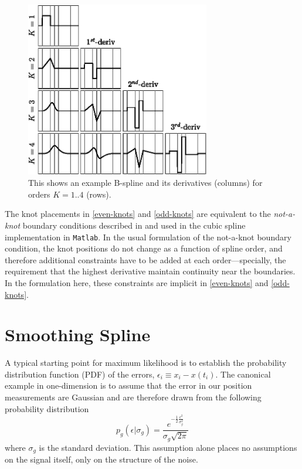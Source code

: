 \documentclass[10pt,journal]{IEEEtran}
\begin{document}
\begin{figure}
  \centerline{\includegraphics[width=19pc,angle=0]{figures/bsplines}}
  \caption{This shows an example B-spline and its derivatives (columns) for orders $K=1..4$ (rows).}
  \label{bsplines}
\end{figure}

The knot placements in \ref{even-knots} and \ref{odd-knots} are equivalent to the \textit{not-a-knot} boundary conditions described in \cite{deboor1978-book} and used in the cubic spline implementation in \texttt{Matlab}. In the usual formulation of the not-a-knot boundary condition, the knot positions do not change as a function of spline order, and therefore additional constraints have to be added at each order---specially, the requirement that the highest derivative maintain continuity near the boundaries. In the formulation here, these constraints are implicit in \ref{even-knots} and \ref{odd-knots}.


%
\section{Smoothing Spline}
\label{sec:maximum_likelihood}
%

A typical starting point for maximum likelihood is to establish the probability distribution function (PDF) of the errors, $\epsilon_i \equiv x_i - x(t_i)$. The canonical example in one-dimension is to assume that the error in our position measurements are Gaussian and are therefore drawn from the following probability distribution
\begin{equation}
\label{gaussian_pdf}
p_g(\epsilon|\sigma_g) = \frac{e^{-\frac{1}{2}\frac{\epsilon^2}{\sigma_g^2}} }{\sigma_g \sqrt{ 2 \pi}}
\end{equation}
where $\sigma_g$ is the standard deviation. This assumption alone places no assumptions on the signal itself, only on the structure of the noise.
\end{document}
